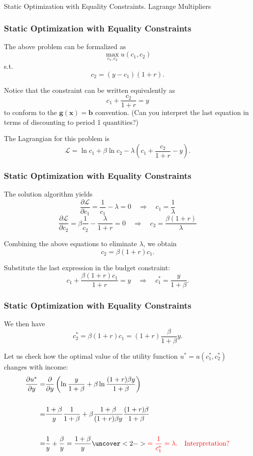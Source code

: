 \documentclass[10pt]{beamer}
\theoremstyle{definition}
\begin{document}
\begin{section}{Static Optimization with Equality Constraints. Lagrange Multipliers}
\begin{frame}[fragile]
\frametitle{Static Optimization with Equality Constraints}
\addtocounter{theorem}{-1}
\begin{example}[cont.]
The above problem can be formalized as \[  \max_{c_1,c_2} u(c_1,c_2) \]
s.t. \[ c_2 = (y-c_1)(1+r). \]

Notice that the constraint can be written equivalently as \[ c_1 + \dfrac{c_2}{1+r} = y \] to conform to the $ \mathbf{g}(\mathbf{x})=\mathbf{b} $ convention. (Can you interpret the last equation in terms of discounting to period 1 quantities?)

The Lagrangian for this problem is \[ \mathcal{L} = \ln c_1 + \beta \ln c_2 - \lambda \left(  c_1 + \frac{c_2}{1+r} - y \right). \]
\end{example}
\end{frame}

\begin{frame}[fragile]
\frametitle{Static Optimization with Equality Constraints}
\addtocounter{theorem}{-1}
\begin{example}[cont.] The solution algorithm yields
\[ \dfrac{\partial \mathcal{L}}{\partial c_1} = \dfrac{1}{c_1} - \lambda = 0 \quad \Rightarrow \quad c_1 = \dfrac{1}{\lambda} \]
\[ \dfrac{\partial \mathcal{L}}{\partial c_2} = \beta \dfrac{1}{c_2} - \dfrac{\lambda}{1+r} = 0 \quad \Rightarrow \quad c_2 = \dfrac{\beta (1+r)}{\lambda} \]

Combining the above equations to eliminate $ \lambda $, we obtain \[ c_2 = \beta (1+r)c_1. \]

Substitute the last expression in the budget constraint:
\[ c_1 + \dfrac{\beta (1+r)c_1}{1+r} = y \quad \Rightarrow \quad c_1^* = \dfrac{y}{1+\beta}.\]
\end{example}
\end{frame}

\begin{frame}[fragile]
\frametitle{Static Optimization with Equality Constraints}
\addtocounter{theorem}{-1}
\begin{example}[cont.] 
We then have \[ c_2^* = \beta (1+r)c_1 =  (1+r)\dfrac{\beta}{1+\beta}y. \]

Let us check how the optimal value of the utility function $u^*= u(c_1^*,c_2^*) $ changes with income: 
\[ \begin{split}
\dfrac{\partial u^*}{\partial y} = & \dfrac{\partial }{\partial y} \left( \ln \dfrac{y}{1+\beta} + \beta \ln  \dfrac{(1+r)\beta y}{1+\beta} \right)\\ {}\\
= & \dfrac{1+\beta}{y}\dfrac{1}{1+\beta} + \beta \dfrac{1+\beta}{(1+r)\beta y} \dfrac{(1+r)\beta }{1+\beta} \\{}\\
= & \dfrac{1}{y}+\dfrac{\beta}{y} = \dfrac{1+\beta}{y}  \uncover<2->{\color{red}{= \dfrac{1}{c_1^*} = \lambda. \quad \text{Interpretation?}}}
\end{split}\] 
\end{example}
\end{frame}


\end{section}
\end{document}
